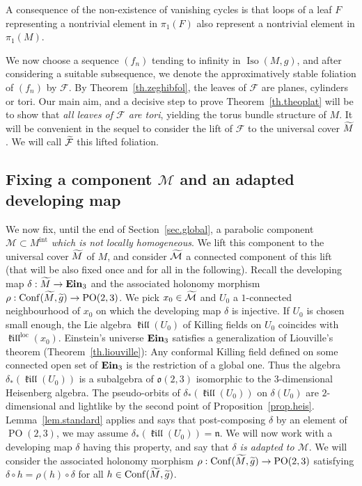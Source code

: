 \documentclass[11pt]{article}
\theoremstyle{definition}
\numberwithin{equation}{section}
\numberwithin{figure}{section}
\numberwithin{table}{section}
\DeclareMathOperator{\Conf}{Conf}
\DeclareMathOperator{\Iso}{Iso}
\DeclareMathOperator{\ein}{{\bf Ein}_3}
\DeclareMathOperator{\loc}{loc}
\newcommand{\mint}{{M^{\intl}}}
\DeclareMathOperator{\intl}{int}
\DeclareMathOperator{\kil}{{\mathfrak{kill}}}
\newcommand{\kiloc}{\kil^{\loc}}
\newcommand{\calf}{\mathcal{F}}
\newcommand{\calm}{\mathcal{M}}
\newcommand{\tcalm}{\tilde{\mathcal{M}}}
\newcommand{\tm}{\tilde{{M}}}
\newcommand{\tcalf}{\tilde{{\mathcal{F}}}}
\newcommand{\lien}{{\mathfrak{n}}}
\newcommand{\oo}{{\mathfrak{o}}}
\DeclareMathOperator{\POop}{PO}
\newcommand{\PO}{{\POop(2,3)}}
\let\oldtilde\tilde
\renewcommand*\tilde[1]{\mathchoice{\widetilde{#1}}{\widetilde{#1}}{\widetilde{#1}}{\oldtilde{#1}}}
\begin{document}
A consequence of the non-existence of vanishing cycles is that loops of a leaf $F$ representing a nontrivial element in $\pi_1(F)$ also represent a nontrivial element in $\pi_1(M)$.



We now choose a sequence $(f_n)$ tending to infinity in $\Iso(M,g)$, and after considering a suitable subsequence, we denote the approximatively stable foliation of $(f_n)$ by $\calf$. By Theorem~\ref{th.zeghibfol}, the leaves of $\calf$ are planes, cylinders or tori. Our main aim, and a decisive step to prove Theorem~\ref{th.theoplat} will be to show that \emph{all leaves of $\calf$ are tori}, yielding the torus bundle structure of $M$. It will be convenient in the sequel to consider the lift of $\calf$ to the universal cover $\tm$. We will call $\tcalf$ this lifted foliation.



\subsection{Fixing a component \texorpdfstring{$\calm$}{calm} and an adapted developing map}\label{sec.adapted}
We now fix, until the end of Section~\ref{sec.global}, a parabolic component $\calm \subset \mint$ \emph{which is not locally homogeneous}. We lift this component to the universal cover $\tm$ of $M$, and consider $\tcalm$ a connected component of this lift (that will be also fixed once and for all in the following). Recall the developing map $\delta: \tilde{M} \to \ein$ and the associated holonomy morphism $\rho: \Conf(\tilde{M}, \tilde{g}) \to \PO$. We pick $x_0 \in \tcalm$ and $U_0$ a $1$-connected neighbourhood of $x_0$ on which the developing map $\delta$ is injective. If $U_0$ is chosen small enough, the Lie algebra $\kil(U_0)$ of Killing fields on $U_0$ coincides with $\kiloc(x_0)$. Einstein's universe $\ein$ satisfies a generalization of Liouville's theorem (Theorem~\ref{th.liouville}): Any conformal Killing field defined on some connected open set of $\ein$ is the restriction of a global one. Thus the algebra $\delta_*(\kil(U_0))$ is a subalgebra of $\oo(2,3)$ isomorphic to the $3$-dimensional Heisenberg algebra. The pseudo-orbits of $\delta_*(\kil(U_0))$ on $\delta(U_0)$ are $2$-dimensional and lightlike by the second point of Proposition~\ref{prop.heis}. Lemma~\ref{lem.standard} applies and says that post-composing $\delta$ by an element of $\PO$, we may assume $\delta_*(\kil(U_0))=\lien$. We will now work with a developing map $\delta$ having this property, and say that \emph{$\delta$ is adapted to $\calm$}. We will consider the associated holonomy morphism $\rho: \Conf(\tilde{M}, \tilde{g}) \to \PO$ satisfying $\delta \circ h = \rho(h) \circ \delta$ for all $h \in \Conf(\tilde{M}, \tilde{g})$.
\end{document}
